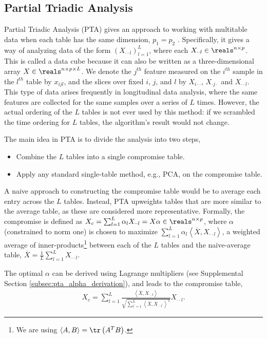 \subsection{Partial Triadic Analysis}
\label{subsec:partial_triadic_analysis}

Partial Triadic Analysis (PTA) gives an approach to working with multitable data
when each table has the same dimension, $p_1 = p_2$
\citep{leibovici1993facteurs, thioulouse2011simultaneous}. Specifically, it
gives a way of analyzing data of the form $\left(X_{\cdot\cdot l}\right)_{l =
  1}^{L}$, where each $X_{\cdot\cdot l} \in \reals^{n \times p}$. This is called
a data cube because it can also be written as a three-dimensional array $X \in
\reals^{n \times p \times L}$. We denote the $j^{th}$ feature measured on the
$i^{th}$ sample in the $l^{th}$ table by $x_{ijl}$, and the slices over fixed
$i$, $j$, and $l$ by $X_{i \cdot \cdot}$, $X_{\cdot j \cdot}$ and $X_{\cdot
  \cdot l}$. This type of data arises frequently in longitudinal data analysis,
where the same features are collected for the same samples over a series of $L$
times. However, the actual ordering of the $L$ tables is not ever used by this
method: if we scrambled the time ordering for $L$ tables, the algorithm's result
would not change.

The main idea in PTA is to divide the analysis into two steps,
\begin{itemize}
  \item Combine the $L$ tables into a single compromise table.
  \item Apply any standard single-table method, e.g., PCA, on the compromise
    table.
\end{itemize}

A naive approach to constructing the compromise table would be to average each
entry across the $L$ tables. Instead, PTA upweights tables that are more similar
to the average table, as these are considered more representative. Formally, the
compromise is defined as $X_c = \sum_{l = 1}^{L}\alpha_{l} X_{\cdot\cdot l} =
X\alpha \in \reals^{n \times p}$, where $\alpha$ (constrained to norm one) is
chosen to maximize $\sum_{l = 1}^{L} \alpha_{l} \left<\overline{X},
X_{\cdot\cdot l}\right>$, a weighted average of inner-products\footnote{We are
  using $\left<A, B\right> = \tr\left(A^{T}B\right)$.} between each of the $L$
tables and the naive-average table, $\overline{X} = \frac{1}{L}\sum_{l = 1}^{L}
X_{\cdot\cdot l}$.

The optimal $\alpha$ can be derived using Lagrange multipliers (see Supplemental
Section \ref{subsec:pta_alpha_derivation}), and leads to the compromise table,
\begin{align*}
  X_{c} = \sum_{l = 1}^{L} \frac{\left<\overline{X}, X_{\cdot\cdot
      l}\right>}{\sqrt{\sum_{l^{\prime} =1}^{L}\left<\overline{X}, X_{\cdot\cdot
        l^{\prime}}\right>^{2}}} X_{\cdot\cdot l}.
\end{align*}

